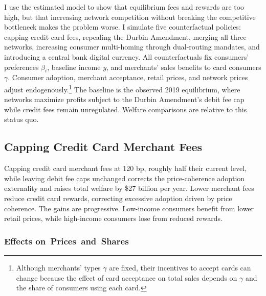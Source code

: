 \documentclass[main.tex]{subfiles}
\begin{document}
I use the estimated model to show that equilibrium fees and rewards are too high, but that increasing network competition without breaking the competitive bottleneck makes the problem worse.
I simulate five counterfactual policies: capping credit card fees, repealing the Durbin Amendment, merging all three networks, increasing consumer multi-homing through dual-routing mandates, and introducing a central bank digital currency.
All counterfactuals fix consumers' preferences $\beta_i$, baseline income $y$, and merchants' sales benefits to card consumers $\gamma$.
Consumer adoption, merchant acceptance, retail prices, and network prices adjust endogenously.\footnote{
    Although merchants' types $\gamma$ are fixed, their incentives to accept cards can change because the effect of card acceptance on total sales depends on $\gamma$ and the share of consumers using each card.
}
The baseline is the observed 2019 equilibrium, where networks maximize profits subject to the Durbin Amendment's debit fee cap while credit fees remain unregulated.
Welfare comparisons are relative to this status quo.

\subsection{Capping Credit Card Merchant Fees}
\label{subsec:cap-fees-intro}

Capping credit card merchant fees at 120 bp, roughly half their current level, while leaving debit fee caps unchanged corrects the price-coherence adoption externality and raises total welfare by \$27 billion per year.
Lower merchant fees reduce credit card rewards, correcting excessive adoption driven by price coherence.
The gains are progressive.
Low-income consumers benefit from lower retail prices, while high-income consumers lose from reduced rewards.

\subsubsection{Effects on~Prices~and~Shares}
\label{subsubsec:cf-price-share-effects}
\end{document}
